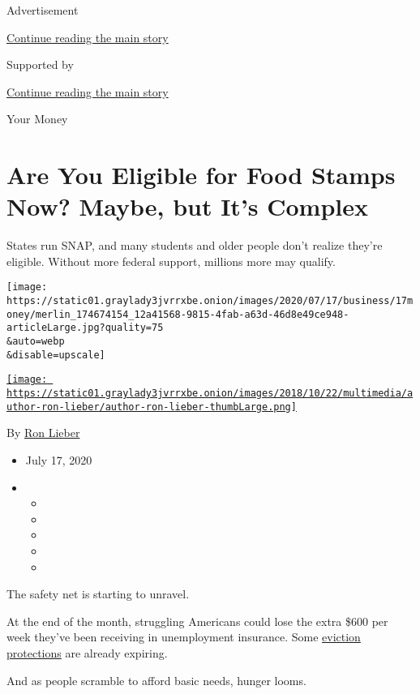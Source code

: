 Advertisement

\protect\hyperlink{after-top}{Continue reading the main story}

Supported by

\protect\hyperlink{after-sponsor}{Continue reading the main story}

Your Money

\hypertarget{are-you-eligible-for-food-stamps-now-maybe-but-its-complex}{%
\section{Are You Eligible for Food Stamps Now? Maybe, but It's
Complex}\label{are-you-eligible-for-food-stamps-now-maybe-but-its-complex}}

States run SNAP, and many students and older people don't realize
they're eligible. Without more federal support, millions more may
qualify.

\texttt{[image: https://static01.graylady3jvrrxbe.onion/images/2020/07/17/business/17money/merlin\_174674154\_12a41568-9815-4fab-a63d-46d8e49ce948-articleLarge.jpg?quality=75\\\&auto=webp\\\&disable=upscale]}

\href{https://www.nytimes3xbfgragh.onion/by/ron-lieber}{\texttt{[image: https://static01.graylady3jvrrxbe.onion/images/2018/10/22/multimedia/author-ron-lieber/author-ron-lieber-thumbLarge.png]}}

By \href{https://www.nytimes3xbfgragh.onion/by/ron-lieber}{Ron Lieber}

\begin{itemize}
\item
  July 17, 2020
\item
  \begin{itemize}
  \item
  \item
  \item
  \item
  \item
  \end{itemize}
\end{itemize}

The safety net is starting to unravel.

At the end of the month, struggling Americans could lose the extra \$600
per week they've been receiving in unemployment insurance. Some
\href{https://www.nytimes3xbfgragh.onion/2020/07/11/your-money/coronavirus-eviction-prevention-renters-landlord.html}{eviction
protections} are already expiring.

And as people scramble to afford basic needs, hunger looms.

